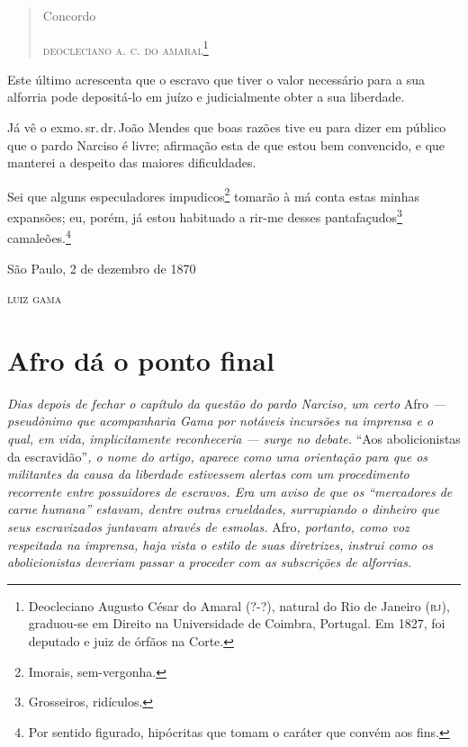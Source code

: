 \begin{quote}
Concordo

\begin{flushright}
\textsc{deocleciano a. c. do amaral}\footnote{ Deocleciano Augusto César do
  Amaral (?-?), natural do Rio de Janeiro (\textsc{rj}), graduou-se em Direito na
  Universidade de Coimbra, Portugal. Em 1827, foi deputado e juiz de
  órfãos na Corte.}
\end{flushright}
\end{quote}

Este último acrescenta que o escravo que tiver o valor necessário para a
sua alforria pode depositá-lo em juízo e judicialmente obter a sua
liberdade.

Já vê o exmo.\,sr.\,dr.\,João Mendes que boas razões tive eu para dizer em
público que o pardo Narciso é livre; afirmação esta de que estou bem
convencido, e que manterei a despeito das maiores dificuldades.

Sei que alguns especuladores impudicos\footnote{ Imorais,
  sem-vergonha.} tomarão à má conta estas minhas expansões; eu, porém,
já estou habituado a rir-me desses pantafaçudos\footnote{
  Grosseiros, ridículos.} camaleões.\footnote{
  Por sentido figurado, hipócritas que tomam o caráter que convém aos
  fins.}

\begin{flushright}
São Paulo, 2 de dezembro de 1870

\textsc{luiz gama}
\end{flushright}

\part{Afro dá o ponto final}

\begin{argumento}
\emph{Dias depois de fechar o capítulo da questão do pardo Narciso, um
certo} Afro \emph{--- pseudônimo que acompanharia Gama por notáveis
incursões na imprensa e o qual, em vida, implicitamente reconheceria ---
surge no debate.} ``Aos abolicionistas da escravidão''\emph{, o nome do
artigo, aparece como uma orientação para que os militantes da causa da
liberdade estivessem alertas com um procedimento recorrente entre
possuidores de escravos. Era um aviso de que os ``mercadores de carne
humana'' estavam, dentre outras crueldades, surrupiando o dinheiro que
seus escravizados juntavam através de esmolas.} Afro\emph{, portanto,
como voz respeitada na imprensa, haja vista o estilo de suas diretrizes,
instrui como os abolicionistas deveriam passar a proceder com as
subscrições de alforrias.}
\end{argumento}

